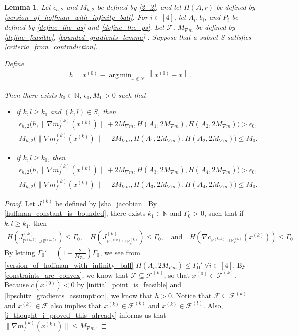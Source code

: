 \documentclass{article}
\newtheorem{lemma}[theorem]{Lemma}
\theoremstyle{case}
\numberwithin{theorem}{subsection}
\DeclareMathOperator*{\argmin}{arg\,min}
\newcommand{\feasiblek}{{\mathcal F^{(k)}}}
\newcommand{\feasiblel}{{\mathcal F^{(l)}}}
\newcommand{\feasible}{{\mathcal F}}
\newcommand{\gk}{{\nabla m_f^{(k)}\left(\xk\right)}}
\newcommand{\huff}{{\Gamma_0}}
\newcommand{\naturals}{\mathbb N}
\newcommand{\xk}{x^{(k)}}
\newcommand{\xinit}{{x^{(0)}}}
\newcommand{\trueactiveprojk}{{\mathbb P_c^{(k)}}}
\newcommand{\activeprojkk}{{\mathbb P^{(k, k)}}}
\newcommand{\activeprojkl}{{\mathbb P^{(k, l)}}}
\newcommand{\maxmodelgrad}{{M_{\nabla m}}}
\newcommand{\jackk}{{J^{(k)}}}
\newcommand{\jackkl}{{J^{(k)}_{\activeprojkk \cup \activeprojkl}}}
\newcommand{\jackt}{{J^{(k)}_{\activeprojkk \cup \trueactiveprojk}}}
\begin{document}
\begin{lemma}
\label{its_all_bounded}
Let $\epsilon_{h, 2}$ and $M_{h, 2}$ be defined by \cref{2_2},
and let $H(A, r)$ be defined by \cref{version_of_hoffman_with_infinity_ball}.
For $i \in [4]$, let $A_i, b_i$, and $P_i$ be defined by \cref{define_the_as} and \cref{define_the_ps}.
Let
$\feasible$, $\maxmodelgrad$
be defined by
\cref{define_feasible},
\cref{bounded_gradients_lemma}
.
Suppose that a subset $S$ satisfies \cref{criteria_from_contradiction}.

Define 
\begin{align*}
h = \xinit - \argmin_{x \not \in \feasible} \left\|\xinit - x\right\|.
\end{align*}

Then there exists $k_0 \in \naturals$, $\epsilon_0, M_0 > 0$ such that
\begin{itemize}
\item if $k, l \ge k_0$ and $(k, l) \in S$, then
\begin{align*}
\epsilon_{h, 2}\big(h, \|\gk\| + 2 \maxmodelgrad, H\left(A_1, 2 \maxmodelgrad\right), H\left(A_2, 2 \maxmodelgrad\right)\big) > \epsilon_0, \\
         M_{h, 2} \big(\|\gk\| + 2 \maxmodelgrad, H\left(A_1, 2 \maxmodelgrad\right), H\left(A_2, 2 \maxmodelgrad\right)\big) \le M_0.
\end{align*}
\item if $k, l \ge k_0$, then
\begin{align*}
\epsilon_{h, 2}\big(h, \|\gk\| + 2 \maxmodelgrad, H\left(A_3, 2 \maxmodelgrad\right), H\left(A_4, 2 \maxmodelgrad\right)\big) > \epsilon_0, \\
		 M_{h, 2} \big(\|\gk\| + 2 \maxmodelgrad, H\left(A_3, 2 \maxmodelgrad\right), H\left(A_4, 2 \maxmodelgrad\right)\big) \le M_0.
\end{align*}
\end{itemize}
\end{lemma}
\begin{proof}
Let $\jackk$ be defined by \cref{sha_jacobian}.
By \cref{huffman_constant_is_bounded}, there exists $k_1 \in \naturals$ and $\huff > 0$, such that if $k, l \ge k_1$, then 
\begin{align*}
H\left(\jackkl \right) \le \huff,
\quad 
H\left(\jackt\right) \le \huff,
\quad \textrm{and} \quad
H\left(\nabla c_{\activeprojkk \cup \trueactiveprojk }\left(\xk\right)\right) \le \huff.
\end{align*}
By letting $\huff' = \left(1 + \frac 2 {\maxmodelgrad} \right) \huff$, we see from \cref{version_of_hoffman_with_infinity_ball}
$H\left(A_i, 2 \maxmodelgrad\right) \le \huff' \; \forall i \in [4].$
By \cref{constraints_are_convex}, we know that $\feasible \subseteq \feasiblek$, so that $\xinit \in \feasiblek$.
Because $c\left(\xinit\right) < 0$ by \cref{initial_point_is_feasible} and \cref{lipschitz_gradients_assumption}, we know that $h > 0$.
Notice that $\feasible \subseteq \feasiblek$ and $\xk \in \feasible$ also implies that
$\xk \in \feasiblek$ and $\xk \in \feasiblel$.
Also, \cref{i_thought_i_proved_this_already} informs us that $\|\gk\| \le \maxmodelgrad$.

\end{proof}
\end{document}
